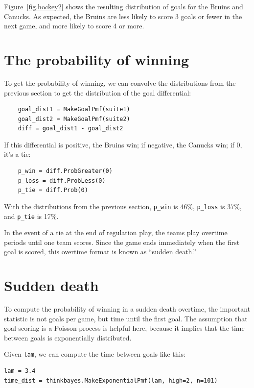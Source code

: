 \documentclass[12pt]{book}
\begin{document}
Figure~\ref{fig.hockey2} shows the resulting distribution of goals for
the Bruins and Canucks.  As expected, the Bruins are less likely to
score 3 goals or fewer in the next game, and more likely to score 4 or
more.

\section{The probability of winning}

To get the probability of winning, we can convolve the distributions
from the previous section to get the distribution of the goal
differential:

\begin{verbatim}
    goal_dist1 = MakeGoalPmf(suite1)
    goal_dist2 = MakeGoalPmf(suite2)
    diff = goal_dist1 - goal_dist2
\end{verbatim}  

If this differential is positive, the Bruins win; if negative,
the Canucks win; if 0, it's a tie:

\begin{verbatim}
    p_win = diff.ProbGreater(0)
    p_loss = diff.ProbLess(0)
    p_tie = diff.Prob(0)
\end{verbatim}  

With the distributions from the previous section, \verb"p_win"
is 46\%, \verb"p_loss" is 37\%, and \verb"p_tie" is 17\%.

In the event of a tie at the end of regulation play, the teams play
overtime periods until one team scores.  Since the game ends
immediately when the first goal is scored, this overtime format
is known as ``sudden death.''


\section{Sudden death}

To compute the probability of winning in a sudden death overtime,
the important statistic is not goals per game, but time until the
first goal.  The assumption that goal-scoring is a Poisson process
is helpful here, because it implies that the time between goals
is exponentially distributed.

Given {\tt lam}, we can compute the time between goals like this: 

\begin{verbatim}
lam = 3.4
time_dist = thinkbayes.MakeExponentialPmf(lam, high=2, n=101)
\end{verbatim}  
\end{document}

